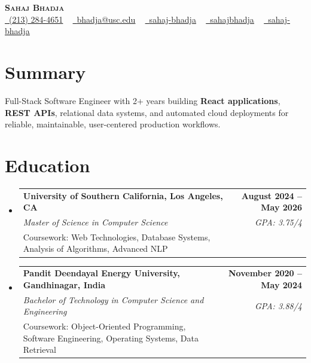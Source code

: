 \documentclass[letterpaper,10pt]{article}
\makeatletter
\newcommand{\sectionGap}{\vspace{-8pt}}
\newcommand{\resumeEduSubheading}[5]{\vspace{-1pt}\item\begin{tabular*}{1.0\textwidth}[t]{l@{\extracolsep{\fill}}r}\textbf{#1} & \textbf{\small #2} \\\textit{\small #3} & \textit{\small #4} \\\small #5 & \\\end{tabular*}\vspace{-4pt}}
\newcommand{\resumeSubHeadingListStart}{\begin{itemize}[leftmargin=0.0in, label={}]}
\newcommand{\resumeSubHeadingListEnd}{\end{itemize}}
\makeatother
\begin{document}
\begin{center}
{\Huge \scshape \textbf{Sahaj Bhadja}} \\ \vspace{1pt}
\small \href{tel:2132844651}{\faPhone\ \underline{(213) 284-4651}} ~ \href{mailto:bhadja@usc.edu}{\raisebox{-0.2\height}\faEnvelope\ \underline{bhadja@usc.edu}} ~
\href{https://www.linkedin.com/in/sahaj-bhadja/}{\raisebox{-0.2\height}\faLinkedin\ \underline{sahaj-bhadja}} ~ \href{https://github.com/SAHAJ-BHADJA}{\raisebox{-0.2\height}\faGithub\ \underline{sahajbhadja}} ~
\href{https://sahaj-bhadja.vercel.app/}{\raisebox{-0.2\height}\faGlobe\ \underline{sahaj-bhadja}}
\end{center}
\vspace{-16pt}
\section{Summary}
\begin{itemize}[leftmargin=0.15in, label={}]
\small{\item{Full-Stack Software Engineer with 2+ years building \textbf{React applications}, \textbf{REST APIs}, relational data systems, and automated cloud deployments for reliable, maintainable, user-centered production workflows.}}
\end{itemize}
\sectionGap
\section{Education}
\resumeSubHeadingListStart
\resumeEduSubheading{University of Southern California, Los Angeles, CA}{August 2024 -- May 2026}{Master of Science in Computer Science}{GPA: 3.75/4}{Coursework: Web Technologies, Database Systems, Analysis of Algorithms, Advanced NLP}
\resumeEduSubheading{Pandit Deendayal Energy University, Gandhinagar, India}{November 2020 -- May 2024}{Bachelor of Technology in Computer Science and Engineering}{GPA: 3.88/4}{Coursework: Object-Oriented Programming, Software Engineering, Operating Systems, Data Retrieval}
\resumeSubHeadingListEnd
\sectionGap
\end{document}
